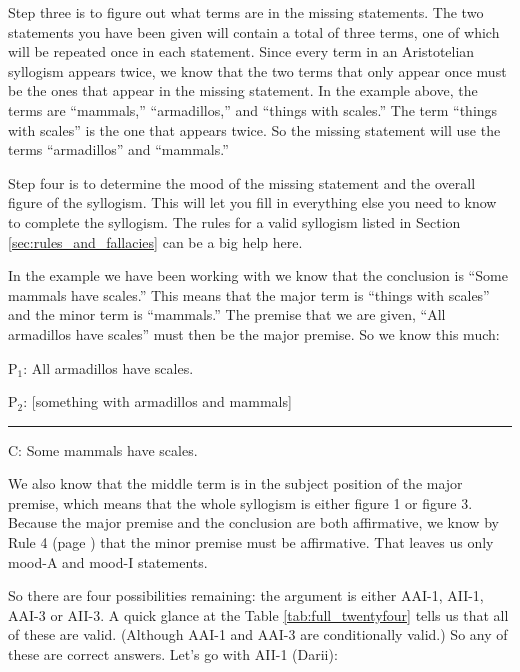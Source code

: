  Step three is to figure out what terms are in the missing statements. The two statements you have been given will contain a total of three terms, one of which will be repeated once in each statement. Since every term in an Aristotelian syllogism appears twice, we know that the two terms that only appear once must be the ones that appear in the missing statement. In the example above, the terms are ``mammals,'' ``armadillos,'' and ``things with scales.'' The term ``things with scales'' is the one that appears twice. So the missing statement will use the terms ``armadillos'' and ``mammals.''
   
Step four is to determine the mood of the missing statement and the overall figure of the syllogism. This will let you fill in everything else you need to know to complete the syllogism. The rules for a valid syllogism listed in Section \ref{sec:rules_and_fallacies} can be a big help here.

In the example we have been working with we know that the conclusion is ``Some mammals have scales.'' This means that the major term is ``things with scales'' and the minor term is ``mammals.'' The premise that we are given, ``All armadillos have scales'' must then be the major premise. So we know this much:

\begin{earg}
\item[P$_1$:] All armadillos have scales.
\item[P$_2$:] [something with armadillos and mammals]
\vspace{-.5em}
\item [] \rule{0.6\linewidth}{.5pt} 
\item[C:] Some mammals have scales. 
\end{earg}

We also know that the middle term is in the subject position of the major premise, which means that the whole syllogism is either figure 1 or figure 3. Because the major premise and the conclusion are both affirmative, we know by Rule 4 (page \pageref{rule4}) that the minor premise must be affirmative. That leaves us only mood-A and mood-I statements. \label{rule_use}

So there are four possibilities remaining: the argument is either AAI-1, AII-1, AAI-3 or AII-3. A quick glance at the Table \ref{tab:full_twentyfour} tells us that all of these are valid. (Although AAI-1 and AAI-3 are conditionally valid.) So any of these are correct answers. Let's go with AII-1 (Darii):


